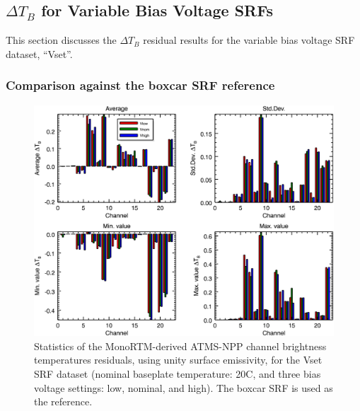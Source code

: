 \subsection{$\Delta T_B$ for Variable Bias Voltage SRFs}
\label{sec:rt.Vset}
This section discusses the $\Delta T_B$ residual results for the variable bias voltage SRF dataset, ``Vset''.


\subsubsection{Comparison against the boxcar SRF reference}
\begin{figure}[H]
  \centering
    \includegraphics[bb=0 0 416 333,clip,scale=0.9]{graphics/dtb/Vset/e1.0_r0.0/stats_ref-boxcar.png} 
  \caption{Statistics of the MonoRTM-derived ATMS-NPP channel brightness temperatures residuals, using unity surface emissivity, for the Vset SRF dataset (nominal baseplate temperature: 20\textdegree{}C, and three bias voltage settings: low, nominal, and high). The boxcar SRF is used as the reference.}
  \label{fig:Vset_e1.0_r0.0_stats_ref-boxcar}
\end{figure}

